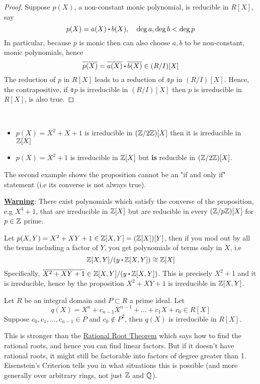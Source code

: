 \documentclass[../Main.tex]{subfiles}
\begin{document}
\begin{proof}
	Suppose $p(X)$, a non-constant monic polynomial, is reducible in $R[X]$, say
	\[p(X)=a(X)\rdot b(X),\quad \deg a, \deg b< \deg p\]
	In particular, because $p$ is monic then can also choose $a,b$ to be non-constant, monic polynomials, hence
	\[\obar{p(X)} = \obar{a(X)}\rdot \obar{b(X)} \in (R/I)[X]\qedhere\]
	The reduction of $p$ in $R[X]$ leads to a reduction of $\obar{p}$ in $(R/I)[X]$. Hence, the contrapositive, if $\obar{p}$ is irreducible in $(R/I)[X]$ then $p$ is irreducible in $R[X]$, is also true.
\end{proof}
\begin{example}~
	\begin{itemize}
		\item $p(X)=X^2+X+1$ is irreducible in $(\mathbb{Z}/2\mathbb{Z})[X]$ then it is irreducible in $\mathbb{Z}[X]$
		\item $p(X)=X^2+1$ is irreducible in $\mathbb{Z}[X]$ but \textbf{is} reducible in $(\mathbb{Z}/2\mathbb{Z})[X]$.
	\end{itemize}
	The second example shows the proposition cannot be an "if and only if" statement (i.e its converse is not always true).
\end{example}
\textbf{\textcolor{BrickRed}{\underline{Warning}}}: There exist polynomials which satisfy the converse of the proposition, e.g $X^4+1$, that are irreducible in $\mathbb{Z}[X]$ but are reducible in every $(\mathbb{Z}/p\mathbb{Z})[X]$ for $p\in \mathbb{Z} $ prime.
\begin{example}
	Let $p(X,Y) = X^2+XY+1\in \mathbb{Z}[X,Y] = (\mathbb{Z}[X])[Y]$, then if you mod out by all the terms including a factor of $Y$, you get polynomials of terms only in $X$, i.e
	\[\Z[X,Y]/(y\rdot \Z[X,Y]) \cong \Z[X]\]
	Specifically, $\obar{X^2+XY+1} \in \Z[X,Y]/(y\rdot \Z[X,Y])$. This is precisely $X^2+1$ and it is irreducible, hence by the proposition $X^2+XY+1$ is irreducible in $\mathbb{Z}[X,Y]$.
\end{example}
\newpage
\begin{thm}[title= Eisenstein's Criterion,label=eisen]
	Let $R$ be an integral domain and $P\subset R$ a prime ideal. Let
	\[q(X)=X^n+c_{n-1}X^{n-1}+\dots+c_1X+c_0\in R[X]\]
	Suppose $c_0,c_1,\dots,c_{n-1}\in P$ and $c_0\notin P^2$, then $q(X)$ is irreducible in $R[X]$.
\end{thm}
This is stronger than the \hyperref[prop:rational]{Rational Root Theorem} which says how to find the rational roots, and hence you can find linear factors. But if it doesn't have rational roots, it might still be factorable into factors of degree greater than 1. Eisenstein's Criterion tells you in what situations this is possible (and more generally over arbitrary rings, not just $\mathbb{Z}$ and $\mathbb{Q}$).
\end{document}
